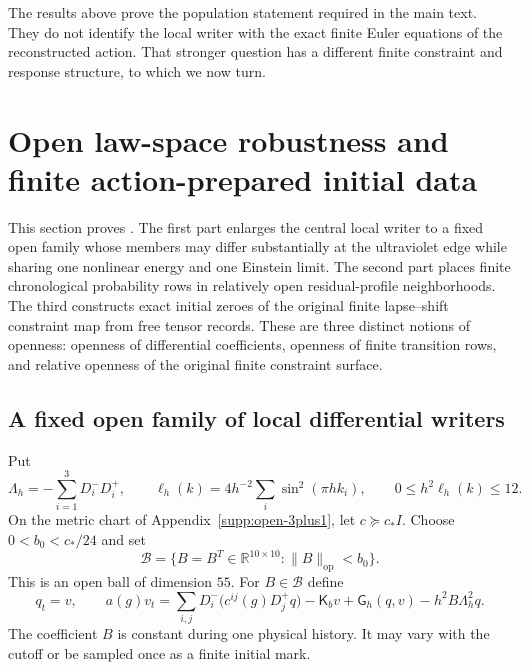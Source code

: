 \documentclass[11pt]{article}
\theoremstyle{definition}
\theoremstyle{remark}
\newcommand{\op}{\mathrm{op}}
\begin{document}
The results above prove the population statement required in the main text.
They do not identify the local writer with the exact finite Euler equations of
the reconstructed action.  That stronger question has a different finite
constraint and response structure, to which we now turn.


\section{Open law-space robustness and finite action-prepared initial data}
\label{supp:open-law-basin}

This section proves .  The first part enlarges
the central local writer to a fixed open family whose members may differ
substantially at the ultraviolet edge while sharing one nonlinear energy and
one Einstein limit.  The second part places finite chronological probability
rows in relatively open residual-profile neighborhoods.  The third constructs
exact initial zeroes of the original finite lapse--shift constraint map from
free tensor records.  These are three distinct notions of openness: openness
of differential coefficients, openness of finite transition rows, and
relative openness of the original finite constraint surface.

\subsection{A fixed open family of local differential writers}

Put
\begin{equation}
 \Lambda_h=-\sum_{i=1}^3D_i^-D_i^+,
 \qquad
 \ell_h(k)=4h^{-2}\sum_i\sin^2(\pi hk_i),
 \qquad0\le h^2\ell_h(k)\le12.
 \label{eq:supp-law-laplacian}
\end{equation}
On the metric chart of Appendix~\ref{supp:open-3plus1}, let
$c\succeq c_*I$.  Choose $0<b_0<c_*/24$ and set
\begin{equation}
 \mathcal B=\{B=B^T\in\mathbb R^{10\times10}:\|B\|_{\op}<b_0\}.
 \label{eq:supp-law-ball}
\end{equation}
This is an open ball of dimension $55$.  For $B\in\mathcal B$ define
\begin{equation}
 q_t=v,\qquad
 a(g)v_t=\sum_{i,j}D_i^-\!\bigl(c^{ij}(g)D_j^+q\bigr)
       -\mathsf K_bv+\mathsf G_h(q,v)-h^2B\Lambda_h^2q.
 \label{eq:supp-law-family}
\end{equation}
The coefficient $B$ is constant during one physical history.  It may vary
with the cutoff or be sampled once as a finite initial mark.
\end{document}
